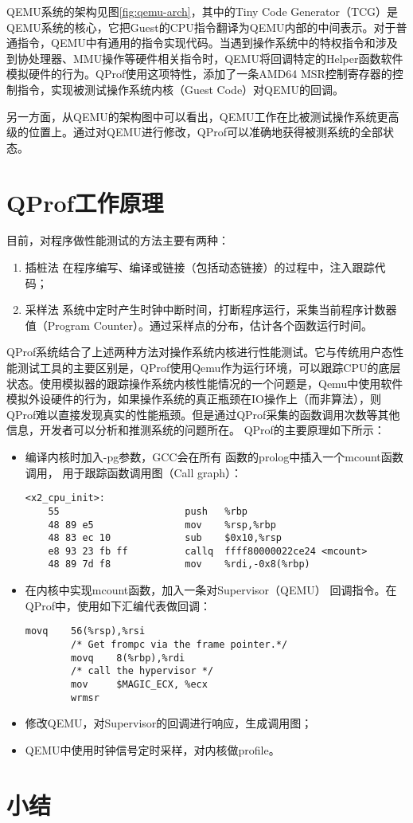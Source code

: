 QEMU系统的架构见图\ref{fig:qemu-arch}，其中的Tiny Code
Generator（TCG）是QEMU系统的核心，它把Guest的CPU指令翻译为QEMU内部的中间表示。对于普通指令，QEMU中有通用的指令实现代码。当遇到操作系统中的特权指令和涉及到协处理器、MMU操作等硬件相关指令时，QEMU将回调特定的Helper函数软件模拟硬件的行为。QProf使用这项特性，添加了一条AMD64
MSR控制寄存器的控制指令，实现被测试操作系统内核（Guest Code）对QEMU的回调。

另一方面，从QEMU的架构图中可以看出，QEMU工作在比被测试操作系统更高级的位置上。通过对QEMU进行修改，QProf可以准确地获得被测系统的全部状态。

\section{QProf工作原理}
	目前，对程序做性能测试的方法主要有两种：
	\begin{enumerate}
		\item {\heiti 插桩法}
			在程序编写、编译或链接（包括动态链接）的过程中，注入跟踪代码；
		\item {\heiti 采样法}
			系统中定时产生时钟中断时间，打断程序运行，采集当前程序计数器值（Program
			Counter）。通过采样点的分布，估计各个函数运行时间。
	\end{enumerate}

	QProf系统结合了上述两种方法对操作系统内核进行性能测试。它与传统用户态性能测试工具的主要区别是，QProf使用Qemu作为运行环境，可以跟踪CPU的底层状态。使用模拟器的跟踪操作系统内核性能情况的一个问题是，Qemu中使用软件模拟外设硬件的行为，如果操作系统的真正瓶颈在IO操作上（而非算法），则QProf难以直接发现真实的性能瓶颈。但是通过QProf采集的函数调用次数等其他信息，开发者可以分析和推测系统的问题所在。 QProf的主要原理如下所示：
	\begin{itemize}
		\item 编译内核时加入-pg参数，GCC会在所有
			函数的prolog中插入一个mcount函数调用，
			用于跟踪函数调用图（Call graph）：
\begin{lstlisting}[language={[x86masm]Assembler}, caption=加入-pg编译参数后的函数序言]
<x2_cpu_init>:                                                 
	55                      push   %rbp                     
	48 89 e5                mov    %rsp,%rbp                
	48 83 ec 10             sub    $0x10,%rsp               
	e8 93 23 fb ff          callq  ffff80000022ce24 <mcount>
	48 89 7d f8             mov    %rdi,-0x8(%rbp)          
\end{lstlisting}

		\item 在内核中实现mcount函数，加入一条对Supervisor（QEMU）
			回调指令。在QProf中，使用如下汇编代表做回调：
\begin{lstlisting}[caption=QProf中mcount函数实现]
        movq    56(%rsp),%rsi
        /* Get frompc via the frame pointer.*/
        movq    8(%rbp),%rdi
        /* call the hypervisor */
        mov     $MAGIC_ECX, %ecx
        wrmsr
\end{lstlisting}
		\item 修改QEMU，对Supervisor的回调进行响应，生成调用图；
		\item QEMU中使用时钟信号定时采样，对内核做profile。
	\end{itemize}

\section{小结}

